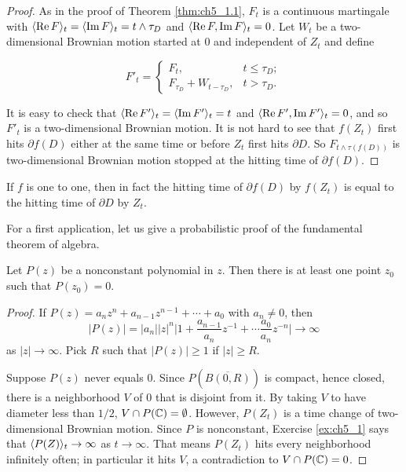 \begin{proof}
As in the proof of Theorem \ref{thm:ch5_1.1}, $F_t$ is a continuous martingale with $\langle \operatorname{Re} F \rangle_t = \langle \operatorname{Im} F \rangle_t = t \wedge \tau_D$ and $\langle \operatorname{Re} F, \operatorname{Im} F \rangle_t = 0$. Let $W_t$ be a two-dimensional Brownian motion started at $0$ and independent of $Z_t$ and define

\[
    F'_t = \begin{cases}
        F_t, & t \leq \tau_D; \\
        F_{\tau_D} + W_{t-\tau_D}, & t > \tau_D.
    \end{cases}
\]

It is easy to check that $\langle \operatorname{Re} F' \rangle_t = \langle \operatorname{Im} F' \rangle_t = t$ and $\langle \operatorname{Re} F', \operatorname{Im} F' \rangle_t = 0$, and so $F'_t$ is a two-dimensional Brownian motion. It is not hard to see that $f(Z_t)$ first hits $\partial f(D)$ either at the same time or before $Z_t$ first hits $\partial D$. So $F_{t \wedge \tau(f(D))}$ is two-dimensional Brownian motion stopped at the hitting time of $\partial f(D)$.
\end{proof}


If $f$ is one to one, then in fact the hitting time of $\partial f(D)$ by $f(Z_t)$ is equal to the hitting time of $\partial D$ by $Z_t$.


For a first application, let us give a probabilistic proof of the fundamental theorem of algebra.

\begin{theorem}\label{thm:ch5_1.3}
Let $P(z)$ be a nonconstant polynomial in $z$. Then there is at least one point $z_0$ such that $P(z_0) = 0$.
\end{theorem}

\begin{proof}
If $P(z) = a_nz^n + a_{n-1}z^{n-1} + \cdots + a_0$ with $a_n \neq 0$, then
\[
    |P(z)| = |a_n||z|^n\Big|1 + \frac{a_{n-1}}{a_n}z^{-1} + \cdots \frac{a_0}{a_n}z^{-n}\Big| \to \infty
\]
as $|z| \to \infty$. Pick $R$ such that $|P(z)| \geq 1$ if $|z| \geq R$.

Suppose $P(z)$ never equals $0$. Since $P(\overline{B(0,R)})$ is compact, hence closed, there is a neighborhood $V$ of $0$ that is disjoint from it. By taking $V$ to have diameter less than $1/2$, $V \cap P(\mathbb{C}) = \emptyset$. However, $P(Z_t)$ is a time change of two-dimensional Brownian motion. Since $P$ is nonconstant, Exercise \ref{ex:ch5_1} says that $\langle P(Z) \rangle_t \to \infty$ as $t \to \infty$. That means $P(Z_t)$ hits every neighborhood infinitely often; in particular it hits $V$, a contradiction to $V \cap P(\mathbb{C}) = 0$.
\end{proof}

